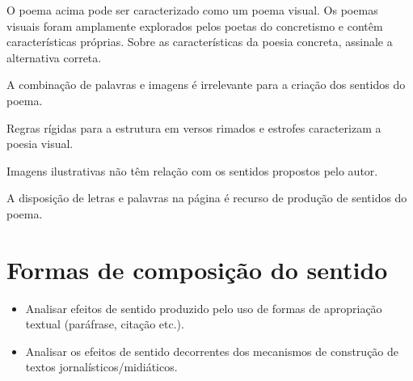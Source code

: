 {{\begin{escolha}

O poema acima pode ser caracterizado como um poema visual. Os poemas
visuais foram amplamente explorados pelos poetas do concretismo e contêm características próprias. Sobre as características da poesia
concreta, assinale a alternativa correta.

\begin{escolha}

  \item A combinação de palavras e imagens é irrelevante para a criação dos sentidos do poema. 

  \item Regras rígidas para a estrutura em versos rimados e estrofes 
  caracterizam a poesia visual.

  \item Imagens ilustrativas não têm relação com os sentidos propostos 
  pelo autor.

  \item A disposição de letras e palavras na página é recurso de produção de sentidos do poema.

\end{escolha}


\chapter{Formas de composição do sentido}


\begin{itemize}
  
  \item Analisar efeitos de sentido produzido pelo uso de formas de apropriação 
  textual (paráfrase, citação etc.).
  
  \item Analisar os efeitos de sentido decorrentes dos mecanismos de construção 
  de textos jornalísticos/midiáticos.


\end{itemize}
\end{escolha}}}

